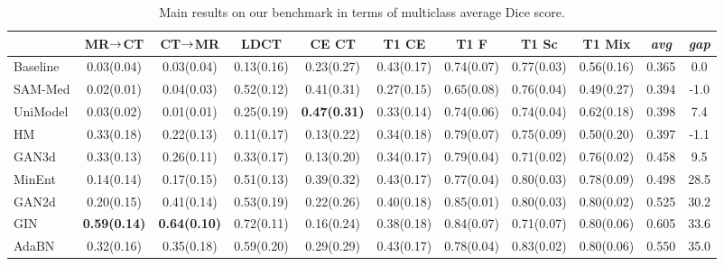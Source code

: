 
\begin{landscape}
\begin{table}[p]
	\centering
	\caption{Main results on our benchmark in terms of multiclass average Dice score.}
	\label{tab:metrics_pure}

		\begin{tabular}{lcccccccccc}
			\toprule
			& MR$\rightarrow$CT & CT$\rightarrow$MR & LDCT & CE CT & T1 CE & T1 F & T1 Sc & T1 Mix & \textit{avg} & \textit{gap} \\
			
			\midrule
			
			Baseline & 0.03(0.04) & 0.03(0.04) & 0.13(0.16) & 0.23(0.27) & 0.43(0.17) & 0.74(0.07) & 0.77(0.03) & 0.56(0.16) & 0.365 & 0.0 \\
			
			\midrule
			
			SAM-Med & 0.02(0.01) & 0.04(0.03) & 0.52(0.12) & 0.41(0.31) & 0.27(0.15) & 0.65(0.08) & 0.76(0.04) & 0.49(0.27) & 0.394 & -1.0 \\
			
			UniModel & 0.03(0.02) & 0.01(0.01) & 0.25(0.19) & \textbf{0.47(0.31)} & 0.33(0.14) & 0.74(0.06) & 0.74(0.04) & 0.62(0.18) & 0.398 & 7.4 \\
			
			\midrule
			
			HM & 0.33(0.18) & 0.22(0.13) & 0.11(0.17) & 0.13(0.22) & 0.34(0.18) & 0.79(0.07) & 0.75(0.09) & 0.50(0.20) & 0.397 & -1.1 \\
			
			GAN3d & 0.33(0.13) & 0.26(0.11) & 0.33(0.17) & 0.13(0.20) & 0.34(0.17) & 0.79(0.04) & 0.71(0.02) & 0.76(0.02) & 0.458 & 9.5 \\
			
			MinEnt & 0.14(0.14) & 0.17(0.15) & 0.51(0.13) & 0.39(0.32) & 0.43(0.17) & 0.77(0.04) & 0.80(0.03) & 0.78(0.09) & 0.498 & 28.5 \\
			
			GAN2d & 0.20(0.15) & 0.41(0.14) & 0.53(0.19) & 0.22(0.26) & 0.40(0.18) & 0.85(0.01) & 0.80(0.03) & 0.80(0.02) & 0.525 & 30.2 \\
			
			GIN & \textbf{0.59(0.14)} & \textbf{0.64(0.10)} & 0.72(0.11) & 0.16(0.24) & 0.38(0.18) & 0.84(0.07) & 0.71(0.07) & 0.80(0.06) & 0.605 & 33.6 \\
			
			AdaBN & 0.32(0.16) & 0.35(0.18) & 0.59(0.20) & 0.29(0.29) & 0.43(0.17) & 0.78(0.04) & 0.83(0.02) & 0.80(0.06) & 0.550 & 35.0 \\
			

\end{tabular}
\end{table}
\end{landscape}
